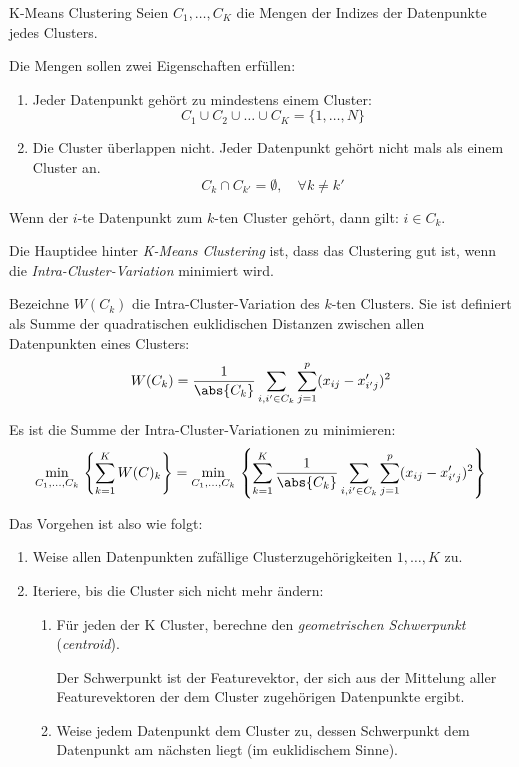 \begin{defi}{K-Means Clustering}
    Seien $C_1, \ldots, C_K$ die Mengen der Indizes der Datenpunkte jedes Clusters.

    Die Mengen sollen zwei Eigenschaften erfüllen:
    \begin{enumerate}
        \item Jeder Datenpunkt gehört zu mindestens einem Cluster:
              \[
                  C_1 \cup C_2 \cup \ldots \cup C_K = \{ 1, \ldots, N \}
              \]
        \item Die Cluster überlappen nicht.
              Jeder Datenpunkt gehört nicht mals als einem Cluster an.
              \[
                  C_k \cap C_{k'} = \emptyset, \quad \forall k \neq k'
              \]
    \end{enumerate}

    Wenn der $i$-te Datenpunkt zum $k$-ten Cluster gehört, dann gilt: $i \in C_k$.

    Die Hauptidee hinter \emph{K-Means Clustering} ist, dass das Clustering gut ist, wenn die \emph{Intra-Cluster-Variation} minimiert wird.

    Bezeichne $W(C_k)$ die Intra-Cluster-Variation des $k$-ten Clusters.
    Sie ist definiert als Summe der quadratischen euklidischen Distanzen zwischen allen Datenpunkten eines Clusters:
    \[
        W(C_k) = \frac{1}{\abs{C_k}} \sum_{i, i' \in C_k} \sum_{j=1}^p (x_{ij} - x'_{i'j})^2
    \]

    Es ist die Summe der Intra-Cluster-Variationen zu minimieren:
    \[
        \min_{C_1, \ldots, C_k} \, \left\{ \sum_{k=1}^K W(C)_k \right\} = \min_{C_1, \ldots, C_k} \, \left\{ \sum_{k=1}^K \frac{1}{\abs{C_k}} \sum_{i, i' \in C_k} \sum_{j=1}^p (x_{ij} - x'_{i'j})^2 \right\}
    \]

    Das Vorgehen ist also wie folgt:
    \begin{enumerate}
        \item Weise allen Datenpunkten zufällige Clusterzugehörigkeiten $1, \ldots, K$ zu.
        \item Iteriere, bis die Cluster sich nicht mehr ändern:
              \begin{enumerate}
                  \item Für jeden der K Cluster, berechne den \emph{geometrischen Schwerpunkt} (\emph{centroid}).

                        Der Schwerpunkt ist der Featurevektor, der sich aus der Mittelung aller Featurevektoren der dem Cluster zugehörigen Datenpunkte ergibt.
                  \item Weise jedem Datenpunkt dem Cluster zu, dessen Schwerpunkt dem Datenpunkt am nächsten liegt (im euklidischem Sinne).
              \end{enumerate}
    \end{enumerate}


\end{defi}
